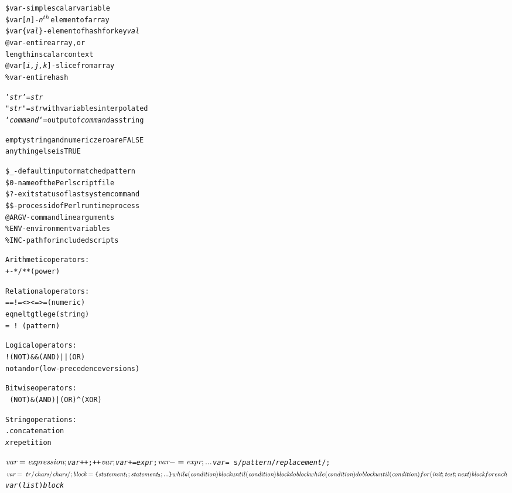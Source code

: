 \documentclass[twocolumn,12pt]{article}
\begin{document}
\begin{alltt}
\verb|$var|         - \textrm{simple scalar variable}
\verb|$var[|\emph{n}\verb|]|      - \emph{n}\(\sp{th}\) \textrm{element of array}
\verb|$var{|\emph{val}\verb|}|    - \textrm{element of hash for key} \emph{val}
\verb|@var|         - \textrm{entire array, or}
               \textrm{length in scalar context}
\verb|@var[|\emph{i,j,k}\verb|]|  - \textrm{slice from array}
\verb|%var|         - \textrm{entire hash}

'\emph{str}' = \emph{str}
"\emph{str}" = \emph{str} with variables interpolated
`\emph{command}` = output of \emph{command} as string

   empty string and numeric zero are FALSE
   \textrm{anything else} is TRUE

\verb|$_|    - \textrm{default input or matched pattern}
\verb|$0|    - \textrm{name of the Perl script file}
\verb|$?|    - \textrm{exit status of last system command}
\verb|$$|    - \textrm{process id of Perl runtime process}
\verb|@ARGV| - \textrm{command line arguments}
\verb|%ENV|  - \textrm{environment variables}
\verb|%INC|  - \textrm{path for included scripts}

\textrm{Arithmetic operators:}
   +  -  *  /  ** \textrm{\footnotesize(power)}  % \textrm{\footnotesize(mod)}  .. \textrm{\footnotesize(range)}

\textrm{Relational operators:}
   ==   !=   <   >   <=   >=   \textrm{(numeric)}
   eq   ne   lt  gt  le   ge   \textrm{(string)}
   =~   !~                     \textrm{(pattern)}

\textrm{Logical operators:}
   ! \textrm{\tiny(NOT)}   && \textrm{\tiny(AND)}   || \textrm{\tiny(OR)}
   not   and   or   \textrm{\small (low-precedence versions)}

\textrm{Bitwise operators:}
   ~ \textrm{\tiny(NOT)}   & \textrm{\tiny(AND)}   | \textrm{\tiny(OR)}   ^ \textrm{\tiny(XOR)}

\textrm{String operations:}
   . concatenation
   \emph{x} repetition
   
$\emph{var} = \emph{expression};
$\emph{var}++;  ++$\emph{var};
$\emph{var} += \emph{expr};  $\emph{var} -= \emph{expr}; ...
$\emph{var} =~ s/\emph{pattern}/\emph{replacement}/;
$\emph{var} =~ tr/\emph{chars}/\emph{chars}/;


\emph{block} = \verb|{| \emph{statement\(\sb{1}\)}; \emph{statement\(\sb{2}\)}; ... \verb|}|

while (\emph{condition}) \emph{block}
until (\emph{condition}) \emph{block}
do \emph{block} while (\emph{condition})
do \emph{block} until (\emph{condition})
for (\emph{init};\emph{test};\emph{next}) \emph{block}
foreach $\emph{var} (\emph{list}) \emph{block}


\end{alltt}
\end{document}
